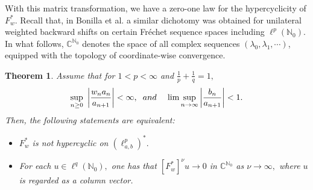 \documentclass[12pt, reqno]{amsart}
\newtheorem{theorem}{Theorem}[section]
\theoremstyle{definition}
\theoremstyle{remark}
\numberwithin{equation}{section}
\begin{document}
With this matrix transformation, we have a zero-one law for the hypercyclicity of $F_w^*$. Recall that, in Bonilla et al. \cite{Bonilla-Cardeccia} a similar dichotomy was obtained for unilateral weighted backward shifts on certain Fr\'{e}chet sequence spaces including $\ell^p(\mathbb{N}_0)$. In what follows, $\mathbb{C}^{\mathbb{N}_0}$ denotes the space of all complex sequences $(\lambda_0,\lambda_1,\cdots)$, equipped with the topology of coordinate-wise convergence.

\begin{theorem}\label{T}
    Assume that for $1<p<\infty$ and $\frac{1}{p}+\frac{1}{q}=1,$
    \begin{equation}\label{yy}
\sup_{n\geq 0}~\left\lvert\frac{ w_{n}a_{n}}{a_{n+1}}\right\rvert<\infty, \hspace{.2cm} and \hspace{.4cm} \lim \sup_{n\rightarrow \infty}\left \lvert \frac{b_{n}}{a_{n+1}}\right \rvert<1.
\end{equation}\label{d}
Then, the following statements are equivalent:
      \begin{itemize}
          \item[(i)] $F_{w}^{*}$ is not hypercyclic on $(\ell^p_{a,b})^*.$
             \item[(ii)] For each $u \in \ell^q(\mathbb{N}_0),$ one has that $[F_{w}^{*}]^{\nu}u\to 0$ in $\mathbb{C}^{\mathbb{N}_0}$ as $\nu\to \infty,$ where $u$ is regarded as a column vector.
      \end{itemize}
\end{theorem}
\end{document}
